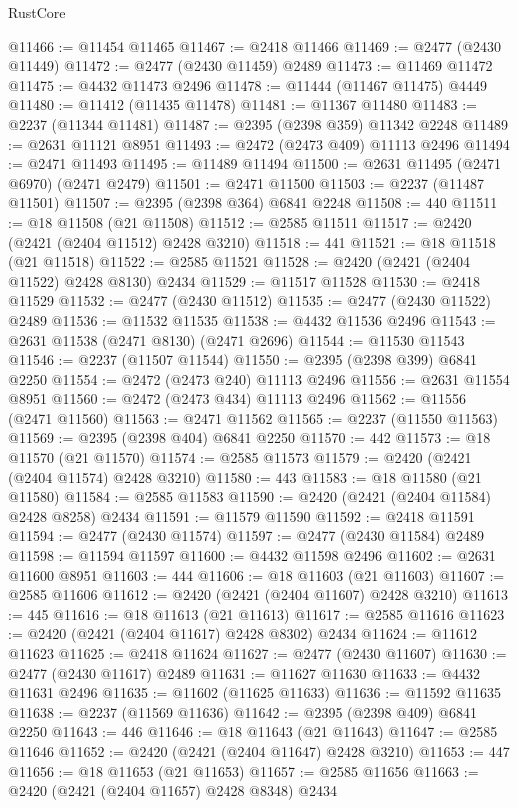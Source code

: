 \begin{lexlean}{RustCore}
\begin{coremodule}
@11466 := @11454 @11465
@11467 := @2418 @11466
@11469 := @2477 (@2430 @11449)
@11472 := @2477 (@2430 @11459) @2489
@11473 := @11469 @11472
@11475 := @4432 @11473 @2496
@11478 := @11444 (@11467 @11475) @4449
@11480 := @11412 (@11435 @11478)
@11481 := @11367 @11480
@11483 := @2237 (@11344 @11481)
@11487 := @2395 (@2398 @359) @11342 @2248
@11489 := @2631 @11121 @8951
@11493 := @2472 (@2473 @409) @11113 @2496
@11494 := @2471 @11493
@11495 := @11489 @11494
@11500 := @2631 @11495 (@2471 @6970) (@2471 @2479)
@11501 := @2471 @11500
@11503 := @2237 (@11487 @11501)
@11507 := @2395 (@2398 @364) @6841 @2248
@11508 := 440
@11511 := @18 @11508 (@21 @11508)
@11512 := @2585 @11511
@11517 := @2420 (@2421 (@2404 @11512) @2428 @3210)
@11518 := 441
@11521 := @18 @11518 (@21 @11518)
@11522 := @2585 @11521
@11528 := @2420 (@2421 (@2404 @11522) @2428 @8130) @2434
@11529 := @11517 @11528
@11530 := @2418 @11529
@11532 := @2477 (@2430 @11512)
@11535 := @2477 (@2430 @11522) @2489
@11536 := @11532 @11535
@11538 := @4432 @11536 @2496
@11543 := @2631 @11538 (@2471 @8130) (@2471 @2696)
@11544 := @11530 @11543
@11546 := @2237 (@11507 @11544)
@11550 := @2395 (@2398 @399) @6841 @2250
@11554 := @2472 (@2473 @240) @11113 @2496
@11556 := @2631 @11554 @8951
@11560 := @2472 (@2473 @434) @11113 @2496
@11562 := @11556 (@2471 @11560)
@11563 := @2471 @11562
@11565 := @2237 (@11550 @11563)
@11569 := @2395 (@2398 @404) @6841 @2250
@11570 := 442
@11573 := @18 @11570 (@21 @11570)
@11574 := @2585 @11573
@11579 := @2420 (@2421 (@2404 @11574) @2428 @3210)
@11580 := 443
@11583 := @18 @11580 (@21 @11580)
@11584 := @2585 @11583
@11590 := @2420 (@2421 (@2404 @11584) @2428 @8258) @2434
@11591 := @11579 @11590
@11592 := @2418 @11591
@11594 := @2477 (@2430 @11574)
@11597 := @2477 (@2430 @11584) @2489
@11598 := @11594 @11597
@11600 := @4432 @11598 @2496
@11602 := @2631 @11600 @8951
@11603 := 444
@11606 := @18 @11603 (@21 @11603)
@11607 := @2585 @11606
@11612 := @2420 (@2421 (@2404 @11607) @2428 @3210)
@11613 := 445
@11616 := @18 @11613 (@21 @11613)
@11617 := @2585 @11616
@11623 := @2420 (@2421 (@2404 @11617) @2428 @8302) @2434
@11624 := @11612 @11623
@11625 := @2418 @11624
@11627 := @2477 (@2430 @11607)
@11630 := @2477 (@2430 @11617) @2489
@11631 := @11627 @11630
@11633 := @4432 @11631 @2496
@11635 := @11602 (@11625 @11633)
@11636 := @11592 @11635
@11638 := @2237 (@11569 @11636)
@11642 := @2395 (@2398 @409) @6841 @2250
@11643 := 446
@11646 := @18 @11643 (@21 @11643)
@11647 := @2585 @11646
@11652 := @2420 (@2421 (@2404 @11647) @2428 @3210)
@11653 := 447
@11656 := @18 @11653 (@21 @11653)
@11657 := @2585 @11656
@11663 := @2420 (@2421 (@2404 @11657) @2428 @8348) @2434

\end{coremodule}
\end{lexlean}
